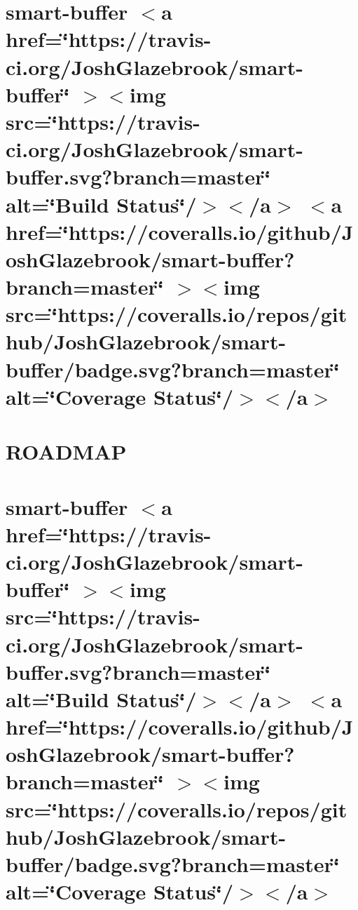 \documentclass[twoside]{book}
\newcommand{\+}{\discretionary{\mbox{\scriptsize$\hookleftarrow$}}{}{}}
\begin{document}
\chapter{smart-\/buffer \texorpdfstring{$<$}{<}a href=\char`\"{}https\+://travis-\/ci.\+org/\+Josh\+Glazebrook/smart-\/buffer\char`\"{} \texorpdfstring{$>$}{>}\texorpdfstring{$<$}{<}img src=\char`\"{}https\+://travis-\/ci.\+org/\+Josh\+Glazebrook/smart-\/buffer.\+svg?branch=master\char`\"{} alt=\char`\"{}\+Build Status\char`\"{}/\texorpdfstring{$>$}{>}\texorpdfstring{$<$}{<}/a\texorpdfstring{$>$}{>} \texorpdfstring{$<$}{<}a href=\char`\"{}https\+://coveralls.\+io/github/\+Josh\+Glazebrook/smart-\/buffer?branch=master\char`\"{} \texorpdfstring{$>$}{>}\texorpdfstring{$<$}{<}img src=\char`\"{}https\+://coveralls.\+io/repos/github/\+Josh\+Glazebrook/smart-\/buffer/badge.\+svg?branch=master\char`\"{} alt=\char`\"{}\+Coverage Status\char`\"{}/\texorpdfstring{$>$}{>}\texorpdfstring{$<$}{<}/a\texorpdfstring{$>$}{>}}
\label{md__c___users_vaishnavi_jadhav__desktop__developer_code_mean_stack_example_server_node_modules_s63d2377ab9b9cb990393e03641b096c8}

\chapter{ROADMAP}
\label{md__c___users_vaishnavi_jadhav__desktop__developer_code_mean_stack_example_server_node_modules_smart_buffer_docs__r_o_a_d_m_a_p}

\chapter{smart-\/buffer \texorpdfstring{$<$}{<}a href=\char`\"{}https\+://travis-\/ci.\+org/\+Josh\+Glazebrook/smart-\/buffer\char`\"{} \texorpdfstring{$>$}{>}\texorpdfstring{$<$}{<}img src=\char`\"{}https\+://travis-\/ci.\+org/\+Josh\+Glazebrook/smart-\/buffer.\+svg?branch=master\char`\"{} alt=\char`\"{}\+Build Status\char`\"{}/\texorpdfstring{$>$}{>}\texorpdfstring{$<$}{<}/a\texorpdfstring{$>$}{>} \texorpdfstring{$<$}{<}a href=\char`\"{}https\+://coveralls.\+io/github/\+Josh\+Glazebrook/smart-\/buffer?branch=master\char`\"{} \texorpdfstring{$>$}{>}\texorpdfstring{$<$}{<}img src=\char`\"{}https\+://coveralls.\+io/repos/github/\+Josh\+Glazebrook/smart-\/buffer/badge.\+svg?branch=master\char`\"{} alt=\char`\"{}\+Coverage Status\char`\"{}/\texorpdfstring{$>$}{>}\texorpdfstring{$<$}{<}/a\texorpdfstring{$>$}{>}}
\label{md__c___users_vaishnavi_jadhav__desktop__developer_code_mean_stack_example_server_node_modules_smart_buffer__r_e_a_d_m_e}

\end{document}
